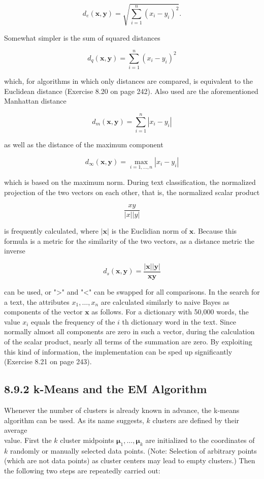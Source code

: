 \documentclass[10pt]{article}
\begin{document}
$$
d_{e}(\boldsymbol{x}, \boldsymbol{y})=\sqrt{\sum_{i=1}^{n}\left(x_{i}-y_{i}\right)^{2}} .
$$

Somewhat simpler is the sum of squared distances

$$
d_{q}(\boldsymbol{x}, \boldsymbol{y})=\sum_{i=1}^{n}\left(x_{i}-y_{i}\right)^{2}
$$

which, for algorithms in which only distances are compared, is equivalent to the Euclidean distance (Exercise 8.20 on page 242). Also used are the aforementioned Manhattan distance

$$
d_{m}(\boldsymbol{x}, \boldsymbol{y})=\sum_{i=1}^{n}\left|x_{i}-y_{i}\right|
$$

as well as the distance of the maximum component

$$
d_{\infty}(\boldsymbol{x}, \boldsymbol{y})=\max _{i=1, \ldots, n}\left|x_{i}-y_{i}\right|
$$

which is based on the maximum norm. During text classification, the normalized projection of the two vectors on each other, that is, the normalized scalar product

$$
\frac{x y}{|x||y|}
$$

is frequently calculated, where $|\boldsymbol{x}|$ is the Euclidian norm of $\boldsymbol{x}$. Because this formula is a metric for the similarity of the two vectors, as a distance metric the inverse

$$
d_{s}(\boldsymbol{x}, \boldsymbol{y})=\frac{|\boldsymbol{x}||\boldsymbol{y}|}{\boldsymbol{x} \boldsymbol{y}}
$$

can be used, or ">" and "<" can be swapped for all comparisons. In the search for a text, the attributes $x_{1}, \ldots, x_{n}$ are calculated similarly to naive Bayes as components of the vector $\boldsymbol{x}$ as follows. For a dictionary with 50,000 words, the value $x_{i}$ equals the frequency of the $i$ th dictionary word in the text. Since normally almost all components are zero in such a vector, during the calculation of the scalar product, nearly all terms of the summation are zero. By exploiting this kind of information, the implementation can be sped up significantly (Exercise 8.21 on page 243).

\subsection*{8.9.2 k-Means and the EM Algorithm}
Whenever the number of clusters is already known in advance, the k-means algorithm can be used. As its name suggests, $k$ clusters are defined by their average\\
value. First the $k$ cluster midpoints $\boldsymbol{\mu}_{1}, \ldots, \boldsymbol{\mu}_{k}$ are initialized to the coordinates of $k$ randomly or manually selected data points. (Note: Selection of arbitrary points (which are not data points) as cluster centers may lead to empty clusters.) Then the following two steps are repeatedly carried out:
\end{document}
